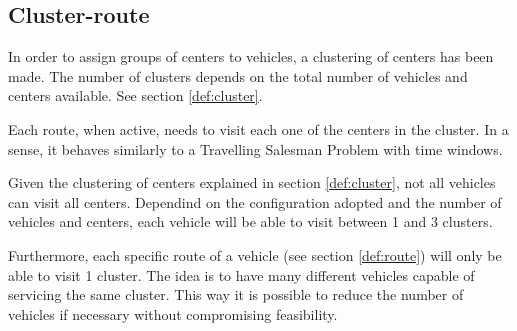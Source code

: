 \subsection{Cluster-route}

In order to assign groups of centers to vehicles, a clustering of centers has been made. The number of clusters depends on the total number of vehicles and centers available. See section \ref{def:cluster}.

Each route, when active, needs to visit each one of the centers in the cluster. In a sense, it behaves similarly to a Travelling Salesman Problem with time windows.

Given the clustering of centers explained in section \ref{def:cluster}, not all vehicles can visit all centers. Dependind on the configuration adopted and the number of vehicles and centers, each vehicle will be able to visit between 1 and 3 clusters. 

Furthermore, each specific route of a vehicle (see section \ref{def:route}) will only be able to visit 1 cluster. The idea is to have many different vehicles capable of servicing the same cluster. This way it is possible to reduce the number of vehicles if necessary without compromising feasibility.